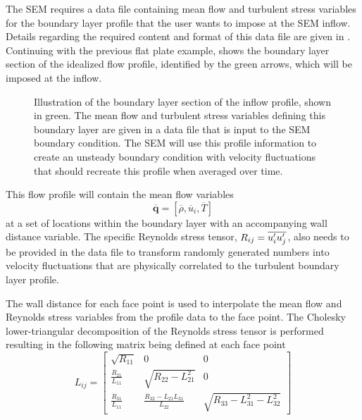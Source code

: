 The SEM requires a data file containing mean flow and turbulent stress
variables for the boundary layer profile that the user wants to impose at
the SEM inflow.
%
Details regarding the required content and format of this data file are given in
.
%
Continuing with the previous flat plate example, 
shows the boundary layer section of the idealized flow profile, identified by
the green arrows, which will be imposed at the inflow.
%
\begin{figure}[tb]
  \centering
  \caption[Illustration of the boundary layer section of the inflow profile.]%
  {Illustration of the boundary layer section of the inflow profile,
  shown in green.
  The mean flow and turbulent stress variables defining this boundary layer
  are given in a data file that is input to the SEM boundary condition.
  The SEM will use this profile information to create an unsteady boundary
  condition with velocity fluctuations that should recreate this profile when
  averaged over time.}
  \label{FIG:SEM:InflowProfile}
\end{figure}
%
This flow profile will contain the mean flow variables
%
\begin{equation*}
  \overline{\bm{q}} =
  \left[\overline{\rho},\overline{u}_i,\overline{T}\right]
\end{equation*}
%
at a set of locations within the boundary layer with an accompanying wall
distance variable.
%
The specific Reynolds stress tensor,
$R_{ij}=\overline{u'_iu'_j}$,
also needs to be provided in the data file
to transform randomly generated numbers into velocity fluctuations that are
physically correlated to the turbulent boundary layer profile.


The wall distance for each face point is used to interpolate the mean flow and
Reynolds stress variables from the profile data to the face point.
%
The Cholesky lower-triangular decomposition of the Reynolds stress tensor
is performed resulting in the following matrix being defined at each face point
%
\begin{equation*}
  L_{ij} = 
  \left[\begin{array}{ccc}
    \sqrt{R_{11}} & 0 & 0 \\[1.0ex]
    \frac{R_{21}}{L_{11}} & \sqrt{R_{22} - L^2_{21}} & 0 \\[1.0ex]
    \frac{R_{31}}{L_{11}} & \frac{R_{32} - L_{21} L_{31}}{L_{22}} & 
              \sqrt{R_{33} - L^2_{31} - L^2_{32}}
  \end{array}\right]
\end{equation*}

